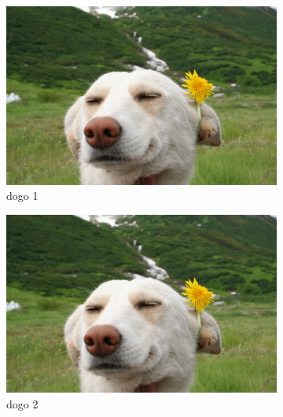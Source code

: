 \documentclass[12pt, a4paper, oneside]{article}
\begin{document}
\begin{figure}[h] %
    \centering
    \begin{subfigure}[b]{0.4\textwidth}
        \includegraphics[trim={0.9cm 0cm 0.9cm 0.73cm}, clip, width=\textwidth]{dog}
        \caption{dogo 1} \vspace{5mm}
    \end{subfigure}
    \hspace{6mm}
    \begin{subfigure}[b]{0.4\textwidth}
        \includegraphics[trim={0.9cm 0cm 0.9cm 0.73cm}, clip, width=\textwidth]{dog}
        \caption{dogo 2} \vspace{5mm}
    \end{subfigure}
    \begin{subfigure}[b]{0.4\textwidth}

\end{subfigure}
\end{figure}
\end{document}
